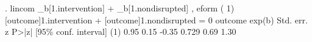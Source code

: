 . lincom _b[1.intervention] + _b[1.nondisrupted] , eform
{\smallskip}
 ( 1)  [outcome]1.intervention + [outcome]1.nondisrupted = 0
{\smallskip}
     outcome {\VBAR}     exp(b)   Std. err.      z    P>|z|     [95\% conf. interval]
         (1) {\VBAR}       0.95       0.15    -0.35   0.729         0.69        1.30
